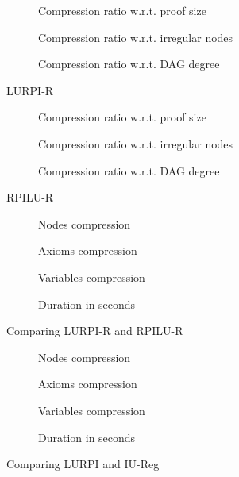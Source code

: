 \begin{figure}[hbt]
  \begin{subfigure}{\textwidth}
    \centering
    \caption{Compression ratio w.r.t. proof size}
  \end{subfigure}
  \begin{subfigure}{\textwidth}
    \centering
    \caption{Compression ratio w.r.t. irregular nodes}
  \end{subfigure}
  \begin{subfigure}{\textwidth}
    \centering
    \caption{Compression ratio w.r.t. DAG degree}
  \end{subfigure}
  \caption{LURPI-R}
\end{figure}
\begin{figure}[hbt]
  \begin{subfigure}{\textwidth}
    \centering
    \caption{Compression ratio w.r.t. proof size}
  \end{subfigure}
  \begin{subfigure}{\textwidth}
    \centering
    \caption{Compression ratio w.r.t. irregular nodes}
  \end{subfigure}
  \begin{subfigure}{\textwidth}
    \centering
    \caption{Compression ratio w.r.t. DAG degree}
  \end{subfigure}
  \caption{RPILU-R}
\end{figure}
\begin{figure}[hbt]
  \begin{subfigure}{0.5\textwidth}
    \centering
    \caption{Nodes compression}
  \end{subfigure}
  \begin{subfigure}{0.5\textwidth}
    \centering
    \caption{Axioms compression}
  \end{subfigure}
  \begin{subfigure}{0.5\textwidth}
    \centering
    \caption{Variables compression}
  \end{subfigure}
  \begin{subfigure}{0.5\textwidth}
    \centering
    \caption{Duration in seconds}
  \end{subfigure}
  \caption{Comparing LURPI-R and RPILU-R}
\end{figure}
\begin{figure}[hbt]
  \begin{subfigure}{0.5\textwidth}
    \centering
    \caption{Nodes compression}
  \end{subfigure}
  \begin{subfigure}{0.5\textwidth}
    \centering
    \caption{Axioms compression}
  \end{subfigure}
  \begin{subfigure}{0.5\textwidth}
    \centering
    \caption{Variables compression}
  \end{subfigure}
  \begin{subfigure}{0.5\textwidth}
    \centering
    \caption{Duration in seconds}
  \end{subfigure}
  \caption{Comparing LURPI and IU-Reg}
\end{figure}
